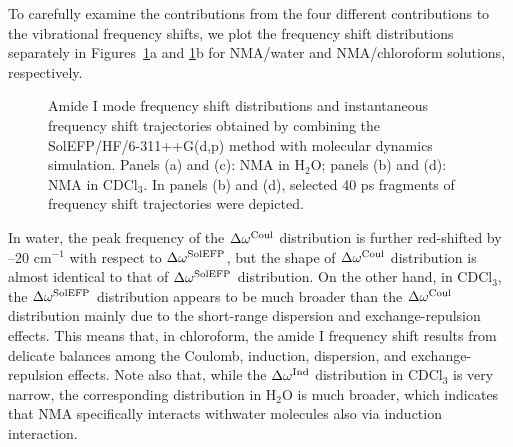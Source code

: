 \documentclass[a4paper,titlepage,twoside,fleqn,12pt]{book}
\begin{document}
\begin{refsection}
To carefully examine the contributions from the four
different contributions to the vibrational frequency shifts, 
we plot the frequency shift distributions
separately in Figures~\ref{f:nma-solefp-md-distr}a and 
\ref{f:nma-solefp-md-distr}b for NMA/water and
NMA/chloroform solutions, respectively. 
%
\begin{figure}[t!]
\centering
\setlength\fboxsep{0.4pt}
\setlength\fboxrule{0.5pt}
\caption{
Amide I mode frequency shift distributions and instantaneous 
frequency shift trajectories obtained by combining 
the SolEFP/HF/6-311++G(d,p) method with molecular dynamics 
simulation. Panels (a) and (c): NMA in H$_2$O; panels (b) and (d): 
NMA in CDCl$_3$. In panels (b) and (d), selected 40 ps fragments 
of frequency shift trajectories were depicted.
\label{f:nma-solefp-md-distr}}
\end{figure}
%
In water, the peak
frequency of the $\Delta\omega^{\rm Coul}$ distribution is further red\hyp{}shifted by
--20 cm$^{-1}$ with respect to $\Delta\omega^{\rm SolEFP}$, but the shape of $\Delta\omega^{\rm Coul}$
distribution is almost identical to that of $\Delta\omega^{\rm SolEFP}$ distribution.
On the other hand, in CDCl$_3$, the $\Delta\omega^{\rm SolEFP}$ distribution appears
to be much broader than the $\Delta\omega^{\rm Coul}$ distribution mainly due
to the short\hyp{}range dispersion and exchange\hyp{}repulsion effects.
This means that, in chloroform, the amide I frequency shift
results from delicate balances among the Coulomb, induction,
dispersion, and exchange\hyp{}repulsion effects. Note also that,
while the $\Delta\omega^{\rm Ind}$ distribution in CDCl$_3$ is very narrow, the
corresponding distribution in H$_2$O is much broader, which
indicates that NMA specifically interacts withwater molecules
also via induction interaction.




\end{refsection}
\end{document}
